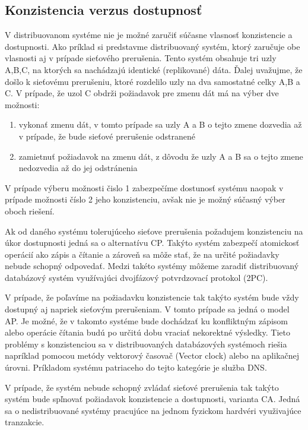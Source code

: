 \documentclass[11pt,twoside,a4paper]{book}
\begin{document}
\subsection{Konzistencia verzus dostupnosť}

V distribuovanom systéme nie je možné zaručiť súčasne vlasnosť konzistencie a dostupnosti. Ako príklad si predstavme distribuovaný systém, ktorý zaručuje obe vlasnosti aj v prípade sieťového prerušenia. Tento systém obsahuje tri uzly A,B,C, na ktorých sa nachádzajú identické (replikované) dáta. Ďalej uvažujme, že došlo k sieťovému prerušeniu, ktoré rozdelilo uzly na dva samostatné celky {A,B} a {C}. V prípade, že uzol C obdrži požiadavok pre zmenu dát má na výber dve možnosti:
\begin{enumerate}
 \item vykonať zmenu dát, v tomto prípade sa uzly A a B o tejto zmene dozvedia až v prípade, že bude sieťové prerušenie odstranené
 \item zamietnuť požiadavok na zmenu dát, z dôvodu že uzly A a B sa o tejto zmene nedozvedia až do jej odstránenia
\end{enumerate}

V prípade výberu možnosti čislo 1 zabezpečíme dostunosť systému naopak v prípade možnosti číslo 2 jeho konzistenciu, avšak nie je možný súčasný výber oboch riešení.

Ak od daného systému tolerujúceho sieťove prerušenia požadujem konzistenciu na úkor dostupnosti jedná sa o alternatívu CP. Takýto systém zabezpečí atomickosť operácií ako zápis a čítanie a zároveň sa môže stať, že na určité požiadavky nebude schopný odpovedať. Medzi takéto systémy môžeme zaradiť distribuovaný databázový systém využívajúci dvojfázový potvrdzovací protokol (2PC).

V prípade, že poľavíme na požiadavku konzistencie tak takýto systém bude vždy dostupný aj napriek sieťovým prerušeniam. V tomto prípade sa jedná o model AP. Je možné, že v takomto systéme bude dochádzať ku konfliktným zápisom alebo operácie čítania budú po určitú dobu vraciať nekorektné výsledky. Tieto problémy s konzistenciou sa v distribuovaných databázových systémoch riešia napríklad pomocou metódy vektorový časovač (Vector clock) alebo na aplikačnej úrovni. Príkladom systému patriaceho do tejto kategórie je služba DNS. 

V prípade, že systém nebude schopný zvládať sieťové prerušenia tak takýto systém bude spľnovať požiadavok konzistencie a dostupnosti, varianta CA. Jedná sa o nedistribuované systémy pracujúce na jednom fyzickom hardvéri využivajúce tranzakcie.
\end{document}
